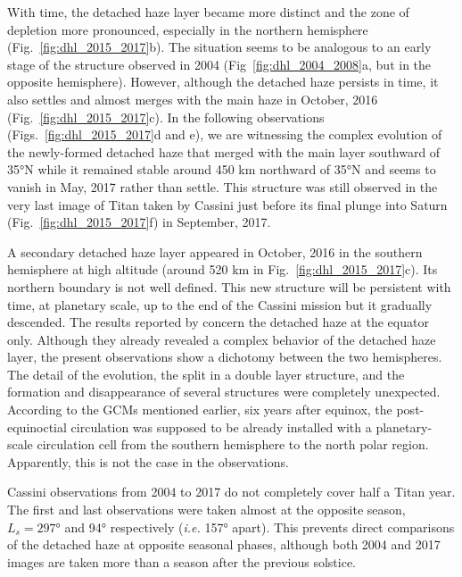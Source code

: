 With time, the detached haze layer became more distinct and the zone of depletion more pronounced, especially in the
northern hemisphere (Fig.~\ref{fig:dhl_2015_2017}b). The situation seems to be analogous to an early stage of
the structure observed in 2004 (Fig~\ref{fig:dhl_2004_2008}a, but in the opposite hemisphere).
However, although the detached haze persists in time,
it also settles and almost merges with the main haze in October, 2016 (Fig.~\ref{fig:dhl_2015_2017}c).
In the  following observations (Figs.~\ref{fig:dhl_2015_2017}d and e), we are
witnessing the complex evolution of the newly-formed detached haze that merged with the main layer southward
of \ang{35}N while it remained stable around 450 km northward of \ang{35}N and seems to vanish in May, 2017 rather than settle.
This structure was still observed in the very last image of Titan taken by Cassini just before its final plunge into Saturn
 (Fig.~\ref{fig:dhl_2015_2017}f) in September, 2017.

A secondary detached haze layer appeared in October, 2016 in the southern hemisphere at high altitude (around 520 km in Fig.~\ref{fig:dhl_2015_2017}c). Its northern boundary is not well defined. This new structure will be persistent with
time, at planetary scale, up to the end of the Cassini mission but it gradually descended. The results reported by \cite{West2018}
concern the detached haze at the equator only. Although they already revealed a complex behavior of the detached haze layer, the
present observations show a dichotomy between the two hemispheres. The detail of the evolution, the split in a double layer
structure, and the formation and disappearance of several structures were completely unexpected. According to the GCMs mentioned earlier, six years
after equinox, the post-equinoctial circulation was supposed to be already installed with a planetary-scale circulation cell
from the southern hemisphere to the north polar region. Apparently, this is not the case in the observations.

Cassini observations from 2004 to 2017 do not completely cover half a Titan year. The first and last observations
were taken almost at the opposite season, $L_s=\ang{297}$ and \ang{94} respectively (\emph{i.e.} \ang{157} apart).
This prevents direct comparisons of the detached haze at opposite seasonal phases,
although both 2004 and 2017 images are taken more than a season after the previous solstice.
